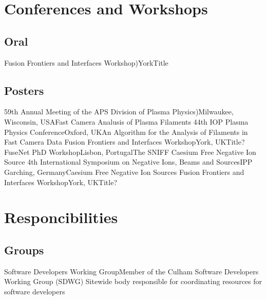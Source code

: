 \documentclass[11pt,a4paper,sans]{moderncv}        %
\begin{document}

\section{Conferences and Workshops}
\subsection{Oral}
{Fusion Frontiers and Interfaces Workshop)}{York}{\newline Title}{}
{}
\subsection{Posters} 
{59th Annual Meeting of the APS Division of Plasma Physics)}{Milwaukee, Wisconsin, USA}{\newline Fast Camera Analusis of Plasma Filaments}{}
{}
{44th IOP Plasma Physics Conference}{Oxford, UK}{\newline An Algorithm for the Analysis of Filaments in Fast Camera Data}{}
{}
{Fusion Frontiers and Interfaces Workshop}{York, UK}{\newline Title?}{}
{}
{FuseNet PhD Workshop}{Lisbon, Portugal}{\newline The SNIFF Caesium Free Negative Ion Source}{}
{}
{4th International Symposium on Negative Ions, Beams and Sources}{IPP Garching, Germany}{\newline Caesium Free Negative Ion Sources}{}
{}
{Fusion Frontiers and Interfaces Workshop}{York, UK}{\newline Title?}{}
{}

\section{Responcibilities}

\subsection{Groups}
{Software Developers Working Group}{Member of the Culham Software Developers Working Group (SDWG)}{}{}
{Sitewide body responsible for coordinating resources for software developers
}
\end{document}
